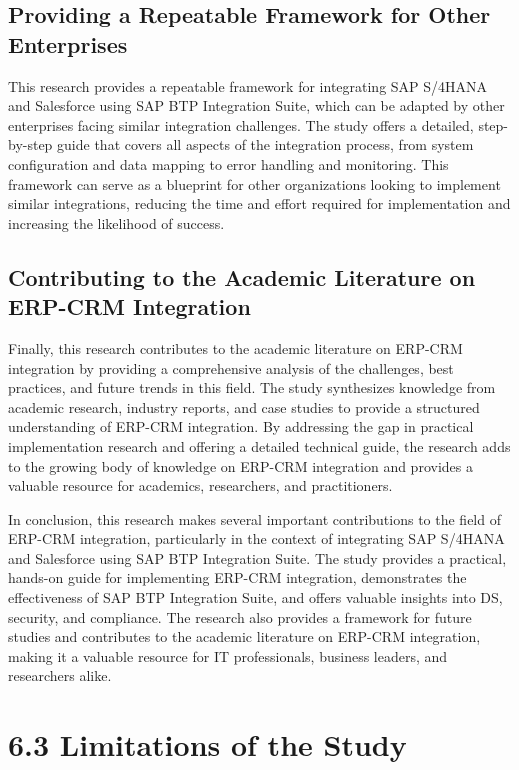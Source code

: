 \subsection{Providing a Repeatable Framework for Other Enterprises}
This research provides a repeatable framework for integrating SAP S/4HANA and Salesforce using SAP BTP Integration Suite, which can be adapted by other enterprises facing similar integration challenges. The study offers a detailed, step-by-step guide that covers all aspects of the integration process, from system configuration and data mapping to error handling and monitoring. This framework can serve as a blueprint for other organizations looking to implement similar integrations, reducing the time and effort required for implementation and increasing the likelihood of success.

\subsection{Contributing to the Academic Literature on ERP-CRM Integration}
Finally, this research contributes to the academic literature on ERP-CRM integration by providing a comprehensive analysis of the challenges, best practices, and future trends in this field. The study synthesizes knowledge from academic research, industry reports, and case studies to provide a structured understanding of ERP-CRM integration. By addressing the gap in practical implementation research and offering a detailed technical guide, the research adds to the growing body of knowledge on ERP-CRM integration and provides a valuable resource for academics, researchers, and practitioners.

In conclusion, this research makes several important contributions to the field of ERP-CRM integration, particularly in the context of integrating SAP S/4HANA and Salesforce using SAP BTP Integration Suite. The study provides a practical, hands-on guide for implementing ERP-CRM integration, demonstrates the effectiveness of SAP BTP Integration Suite, and offers valuable insights into DS, security, and compliance. The research also provides a framework for future studies and contributes to the academic literature on ERP-CRM integration, making it a valuable resource for IT professionals, business leaders, and researchers alike.

\section{6.3 Limitations of the Study}

